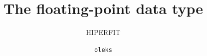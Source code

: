 \documentclass[xcolor=table]{beamer}
\title{The floating-point data type}
\subtitle{HIPERFIT}
\author{\texttt{oleks}}
\begin{document}
\begin{frame}

\titlepage

\end{frame}






\end{document}
